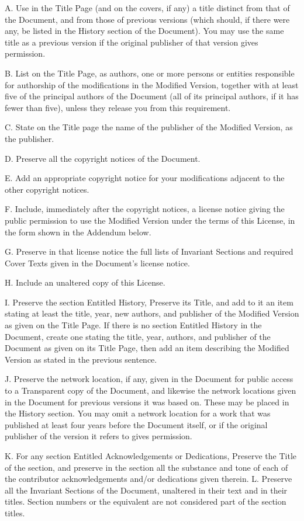 \documentclass[captions=tableheading]{scrbook}
\begin{document}
A. Use in the Title Page (and on the covers, if any) a title distinct from that of the Document, and from those of previous versions (which should, if there were any, be listed in the History section of the Document). You may use the same title as a previous version if the original publisher of that version gives permission. 

B. List on the Title Page, as authors, one or more persons or entities responsible for authorship of the modifications in the Modified Version, together with at least five of the principal authors of the Document (all of its principal authors, if it has fewer than five), unless they release you from this requirement. 

C. State on the Title page the name of the publisher of the Modified Version, as the publisher. 

D. Preserve all the copyright notices of the Document. 

E. Add an appropriate copyright notice for your modifications adjacent to the other copyright notices. 

F. Include, immediately after the copyright notices, a license notice giving the public permission to use the Modified Version under the terms of this License, in the form shown in the Addendum below.  

G. Preserve in that license notice the full lists of Invariant Sections and required Cover Texts given in the Document's license notice. 

H. Include an unaltered copy of this License. 

I. Preserve the section Entitled History, Preserve its Title, and add to it an item stating at least the title, year, new authors, and publisher of the Modified Version as given on the Title Page. If there is no section Entitled History in the Document, create one stating the title, year, authors, and publisher of the Document as given on its Title Page, then add an item describing the Modified Version as stated in the previous sentence. 

J. Preserve the network location, if any, given in the Document for public access to a Transparent copy of the Document, and likewise the network locations given in the Document for previous versions it was based on. These may be placed in the History section. You may omit a network location for a work that was published at least four years before the Document itself, or if the original publisher of the version it refers to gives permission. 

K. For any section Entitled Acknowledgements or Dedications, Preserve the Title of the section, and preserve in the section all the substance and tone of each of the contributor acknowledgements and/or dedications given therein. 
L. Preserve all the Invariant Sections of the Document, unaltered in their text and in their titles. Section numbers or the equivalent are not considered part of the section titles. 
\end{document}
